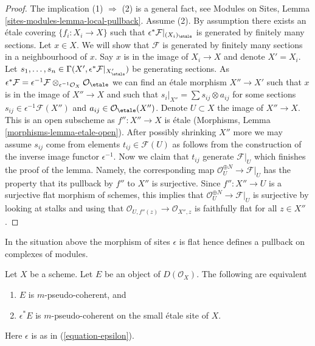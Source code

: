 \begin{proof}
The implication (1) $\Rightarrow$ (2) is a general fact, see
Modules on Sites, Lemma \ref{sites-modules-lemma-local-pullback}.
Assume (2). By assumption there exists an \'etale covering
$\{f_i : X_i \to X\}$ such that
$\epsilon^*\mathcal{F}|_{(X_i)_\etale}$ is generated by
finitely many sections. Let $x \in X$. We will show that $\mathcal{F}$
is generated by finitely many sections in a neighbourhood of $x$.
Say $x$ is in the image of $X_i \to X$ and denote $X' = X_i$. Let
$s_1, \ldots, s_n \in
\Gamma(X', \epsilon^*\mathcal{F}|_{X'_\etale})$
be generating sections. As
$\epsilon^*\mathcal{F} =
\epsilon^{-1}\mathcal{F} \otimes_{\epsilon^{-1}\mathcal{O}_X}
\mathcal{O}_\etale$
we can find an \'etale morphism $X'' \to X'$ such that $x$ is
in the image of $X'' \to X$ and such that
$s_i|_{X''} = \sum s_{ij} \otimes a_{ij}$ for some sections
$s_{ij} \in \epsilon^{-1}\mathcal{F}(X'')$ and
$a_{ij} \in \mathcal{O}_\etale(X'')$. Denote $U \subset X$ the image
of $X'' \to X$. This is an open subscheme as $f'' : X'' \to X$ is \'etale
(Morphisms, Lemma \ref{morphisms-lemma-etale-open}). After possibly
shrinking $X''$ more we may assume $s_{ij}$ come from elements
$t_{ij} \in \mathcal{F}(U)$ as follows from the construction of
the inverse image functor $\epsilon^{-1}$. Now we claim that
$t_{ij}$ generate $\mathcal{F}|_U$ which finishes the proof
of the lemma. Namely, the corresponding map
$\mathcal{O}_U^{\oplus N} \to \mathcal{F}|_U$ has the property
that its pullback by $f''$ to $X''$ is surjective. Since $f'' : X'' \to U$
is a surjective flat morphism of schemes, this implies that
$\mathcal{O}_U^{\oplus N} \to \mathcal{F}|_U$ is surjective by
looking at stalks and using that
$\mathcal{O}_{U, f''(z)} \to \mathcal{O}_{X'', z}$
is faithfully flat for all $z \in X''$.
\end{proof}

\noindent
In the situation above the morphism of sites $\epsilon$ is flat
hence defines a pullback on complexes of modules.

\begin{lemma}
\label{lemma-descend-pseudo-coherent}
Let $X$ be a scheme. Let $E$ be an object of $D(\mathcal{O}_X)$.
The following are equivalent
\begin{enumerate}
\item $E$ is $m$-pseudo-coherent, and
\item $\epsilon^*E$ is $m$-pseudo-coherent on the small \'etale site of $X$.
\end{enumerate}
Here $\epsilon$ is as in (\ref{equation-epsilon}).
\end{lemma}

